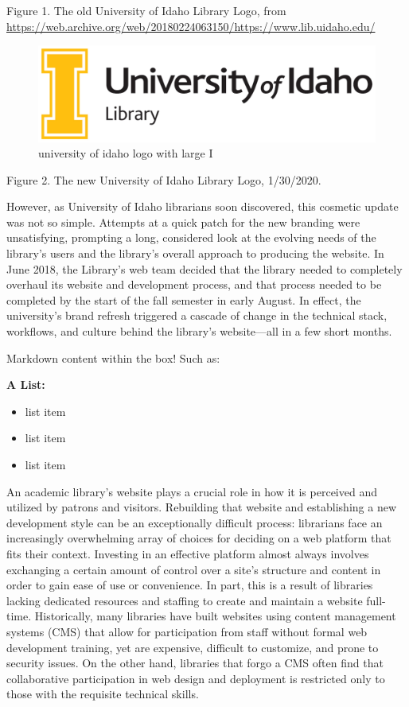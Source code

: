 \documentclass{book}
\providecommand{\tightlist}{%
  \setlength{\itemsep}{0pt}\setlength{\parskip}{0pt}}
\begin{document}
Figure 1. The old University of Idaho Library Logo, from
\url{https://web.archive.org/web/20180224063150/https://www.lib.uidaho.edu/}

\begin{figure}
\centering
\includegraphics{JGJxZF.jpg}
\caption{university of idaho logo with large I}
\end{figure}

Figure 2. The new University of Idaho Library Logo, 1/30/2020.

However, as University of Idaho librarians soon discovered, this cosmetic
update was not so simple. Attempts at a quick patch for the new branding were
unsatisfying, prompting a long, considered look at the evolving needs of the
library's users and the library's overall approach to producing the website.
In June 2018, the Library's web team decided that the library needed to
completely overhaul its website and development process, and that process
needed to be completed by the start of the fall semester in early August. In
effect, the university's brand refresh triggered a cascade of change in the
technical stack, workflows, and culture behind the library's website---all in
a few short months.

Markdown content within the box! Such as:

\textbf{A List:}

\begin{itemize}
\tightlist
\item
  list item
\item
  list item
\item
  list item
\end{itemize}

An academic library's website plays a crucial role in how it is perceived and
utilized by patrons and visitors. Rebuilding that website and establishing a
new development style can be an exceptionally difficult process: librarians
face an increasingly overwhelming array of choices for deciding on a web
platform that fits their context. Investing in an effective platform almost
always involves exchanging a certain amount of control over a site's structure
and content in order to gain ease of use or convenience. In part, this is a
result of libraries lacking dedicated resources and staffing to create and
maintain a website full-time. Historically, many libraries have built websites
using content management systems (CMS) that allow for participation from staff
without formal web development training, yet are expensive, difficult to
customize, and prone to security issues. On the other hand, libraries that
forgo a CMS often find that collaborative participation in web design and
deployment is restricted only to those with the requisite technical skills.
\end{document}
